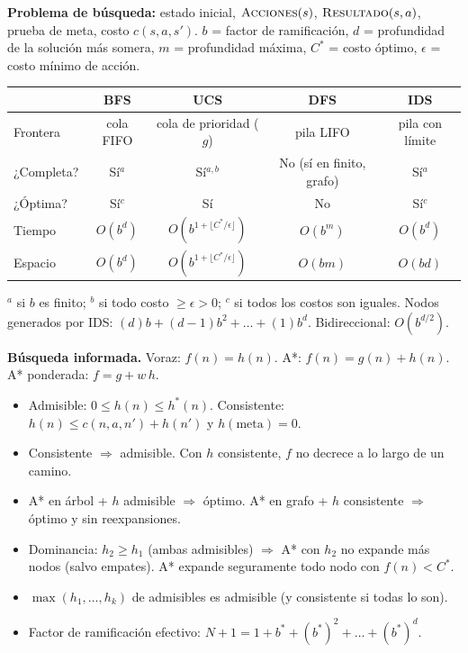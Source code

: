 \begin{formulario}
\textbf{Problema de búsqueda:} estado inicial, $\textsc{Acciones}(s)$, $\textsc{Resultado}(s,a)$,
prueba de meta, costo $c(s,a,s')$. $b$ = factor de ramificación, $d$ = profundidad de la solución
más somera, $m$ = profundidad máxima, $C^*$ = costo óptimo, $\epsilon$ = costo mínimo de acción.

\smallskip
\centering
\renewcommand{\arraystretch}{1.2}
\begin{tabular}{lcccc}
\toprule
 & BFS & UCS & DFS & IDS \\
\midrule
Frontera & cola FIFO & cola de prioridad ($g$) & pila LIFO & pila con límite\\
¿Completa? & Sí$^a$ & Sí$^{a,b}$ & No (sí en finito, grafo) & Sí$^a$\\
¿Óptima? & Sí$^c$ & Sí & No & Sí$^c$\\
Tiempo & $O(b^d)$ & $O(b^{1+\lfloor C^*/\epsilon\rfloor})$ & $O(b^m)$ & $O(b^d)$\\
Espacio & $O(b^d)$ & $O(b^{1+\lfloor C^*/\epsilon\rfloor})$ & $O(bm)$ & $O(bd)$\\
\bottomrule
\end{tabular}

\raggedright\footnotesize $^a$ si $b$ es finito; $^b$ si todo costo $\ge\epsilon>0$; $^c$ si todos los costos son iguales.
Nodos generados por IDS: $(d)b+(d-1)b^2+\dots+(1)b^d$. Bidireccional: $O(b^{d/2})$.
\end{formulario}

\begin{formulario}
\textbf{Búsqueda informada.} Voraz: $f(n)=h(n)$. A*: $f(n)=g(n)+h(n)$. A* ponderada: $f=g+w\,h$.
\begin{itemize}[leftmargin=1.2em]
\item Admisible: $0\le h(n)\le h^*(n)$. \quad Consistente: $h(n)\le c(n,a,n')+h(n')$ y $h(\text{meta})=0$.
\item Consistente $\Rightarrow$ admisible. Con $h$ consistente, $f$ no decrece a lo largo de un camino.
\item A* en árbol + $h$ admisible $\Rightarrow$ óptimo. A* en grafo + $h$ consistente $\Rightarrow$ óptimo y sin reexpansiones.
\item Dominancia: $h_2\ge h_1$ (ambas admisibles) $\Rightarrow$ A* con $h_2$ no expande más nodos (salvo empates).
A* expande seguramente todo nodo con $f(n)<C^*$.
\item $\max(h_1,\dots,h_k)$ de admisibles es admisible (y consistente si todas lo son).
\item Factor de ramificación efectivo: $N+1=1+b^*+(b^*)^2+\dots+(b^*)^d$.
\end{itemize}
\end{formulario}

